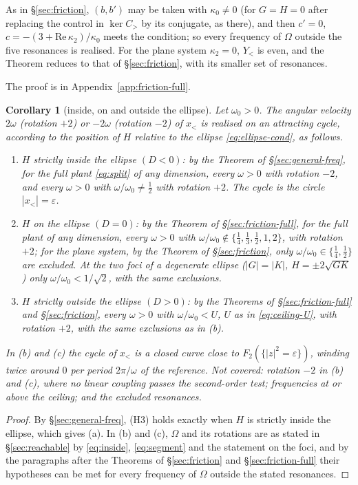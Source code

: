 \documentclass[11pt,reqno]{amsart}
\theoremstyle{plain}
\newtheorem*{corollary}{Corollary}
\theoremstyle{definition}
\theoremstyle{remark}
\begin{document}
As in \S\ref{sec:friction}, $(b,b')$ may be taken with $\kappa_0\ne0$ (for $G=H=0$ after replacing the control in $\ker C_>$ by its conjugate, as there), and then $c'=0$,
$c=-(3+\mathrm{Re}\,\kappa_2)/\kappa_0$ meets the condition; so every frequency of $\Omega$ outside the five resonances is
realised. For the plane system $\kappa_2=0$, $Y_<$ is even, and the Theorem reduces to that of \S\ref{sec:friction},
with its smaller set of resonances.

The proof is in Appendix~\ref{app:friction-full}.

\begin{corollary}[inside, on and outside the ellipse]\label{cor:three}
Let $\omega_0>0$. The angular velocity $2\omega$ \textup{(}rotation $+2$\textup{)} or $-2\omega$ \textup{(}rotation $-2$\textup{)} of
$x_<$ is realised on an attracting cycle, according to the position of $H$ relative to the ellipse
\eqref{eq:ellipse-cond}, as follows.
\begin{enumerate}
\item[\textup{(a)}] \emph{$H$ strictly inside the ellipse} $(D<0)$: by the Theorem of \S\ref{sec:general-freq}, for the full
  plant \eqref{eq:split} of any dimension, every $\omega>0$ with rotation $-2$, and every $\omega>0$ with
  $\omega/\omega_0\ne\frac12$ with rotation $+2$. The cycle is the circle $|x_<|=\varepsilon$.
\item[\textup{(b)}] \emph{$H$ on the ellipse} $(D=0)$: by the Theorem of \S\ref{sec:friction-full}, for the full plant of any
  dimension, every $\omega>0$ with $\omega/\omega_0\notin\{\frac14,\frac13,\frac12,1,2\}$, with rotation $+2$; for the plane system, by
  the Theorem of \S\ref{sec:friction}, only $\omega/\omega_0\in\{\frac14,\frac12\}$ are excluded. At the two foci of a degenerate ellipse
  \textup{(}$|G|=|K|$, $H=\pm2\sqrt{GK}$\textup{)} only $\omega/\omega_0<1/\sqrt2$, with the same exclusions.
\item[\textup{(c)}] \emph{$H$ strictly outside the ellipse} $(D>0)$: by the Theorems of \S\ref{sec:friction-full} and
  \S\ref{sec:friction}, every $\omega>0$ with $\omega/\omega_0<U$, $U$ as in \eqref{eq:ceiling-U}, with rotation $+2$, with the same
  exclusions as in \textup{(b)}.
\end{enumerate}
In \textup{(b)} and \textup{(c)} the cycle of $x_<$ is a closed curve close to $F_2(\{|z|^{2}=\varepsilon\})$, winding twice around
$0$ per period $2\pi/\omega$ of the reference. Not covered: rotation $-2$ in \textup{(b)} and \textup{(c)}, where no linear coupling passes the second-order
test; frequencies at or above the ceiling; and the excluded resonances.
\end{corollary}
\begin{proof}
By \S\ref{sec:general-freq}, \textup{(H3)} holds exactly when $H$ is strictly inside the ellipse, which gives
\textup{(a)}. In \textup{(b)} and \textup{(c)}, $\Omega$ and its rotations are as stated in \S\ref{sec:reachable} by
\eqref{eq:inside}, \eqref{eq:segment} and the statement on the foci, and by the paragraphs after the Theorems of
\S\ref{sec:friction} and \S\ref{sec:friction-full} their hypotheses can be met for every frequency of $\Omega$ outside the
stated resonances.
\end{proof}
\end{document}
